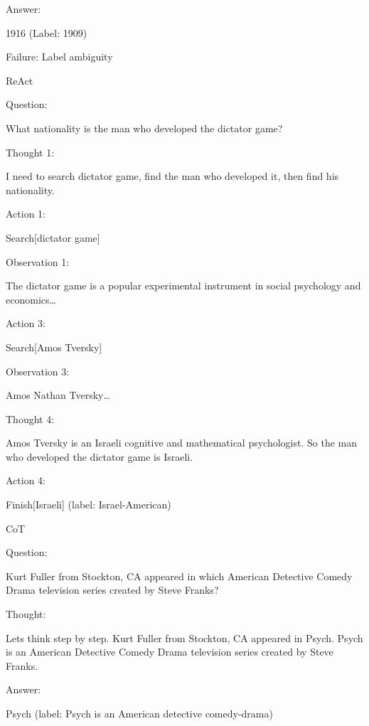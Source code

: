 \documentclass[
]{article}
\begin{document}
Answer:

1916 (Label: 1909)

Failure: Label ambiguity

ReAct

Question:

What nationality is the man who developed the dictator game?

Thought 1:

I need to search dictator game, find the man who developed it, then find
his nationality.

Action 1:

Search{[}dictator game{]}

Observation 1:

The dictator game is a popular experimental instrument in social
psychology and economics\ldots{}

Action 3:

Search{[}Amos Tversky{]}

Observation 3:

Amos Nathan Tversky\ldots{}

Thought 4:

Amos Tversky is an Israeli cognitive and mathematical psychologist. So
the man who developed the dictator game is Israeli.

Action 4:

Finish{[}Israeli{]} (label: Israel-American)

CoT

Question:

Kurt Fuller from Stockton, CA appeared in which American Detective
Comedy Drama television series created by Steve Franks?

Thought:

Let\textquotesingle s think step by step. Kurt Fuller from Stockton, CA
appeared in Psych. Psych is an American Detective Comedy Drama
television series created by Steve Franks.

Answer:

Psych (label: Psych is an American detective comedy-drama)
\end{document}
